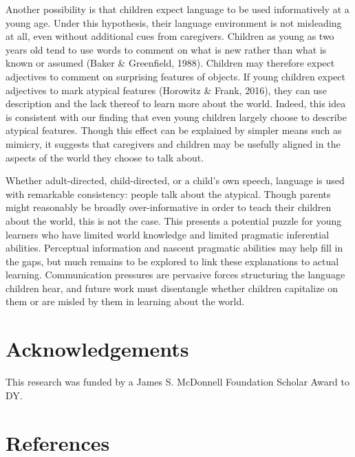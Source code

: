 \documentclass[10pt, letterpaper]{article}
\begin{document}
Another possibility is that children expect language to be used
informatively at a young age. Under this hypothesis, their language
environment is not misleading at all, even without additional cues from
caregivers. Children as young as two years old tend to use words to
comment on what is new rather than what is known or assumed (Baker \&
Greenfield, 1988). Children may therefore expect adjectives to comment
on surprising features of objects. If young children expect adjectives
to mark atypical features (Horowitz \& Frank, 2016), they can use
description and the lack thereof to learn more about the world. Indeed,
this idea is consistent with our finding that even young children
largely choose to describe atypical features. Though this effect can be
explained by simpler means such as mimicry, it suggests that caregivers
and children may be usefully aligned in the aspects of the world they
choose to talk about.

Whether adult-directed, child-directed, or a child's own speech,
language is used with remarkable consistency: people talk about the
atypical. Though parents might reasonably be broadly over-informative in
order to teach their children about the world, this is not the case.
This presents a potential puzzle for young learners who have limited
world knowledge and limited pragmatic inferential abilities. Perceptual
information and nascent pragmatic abilities may help fill in the gaps,
but much remains to be explored to link these explanations to actual
learning. Communication pressures are pervasive forces structuring the
language children hear, and future work must disentangle whether
children capitalize on them or are misled by them in learning about the
world.

\vspace{1em} 

\hypertarget{acknowledgements}{%
\section{Acknowledgements}\label{acknowledgements}}

This research was funded by a James S. McDonnell Foundation Scholar
Award to DY.

\hypertarget{references}{%
\section{References}\label{references}}
\end{document}
